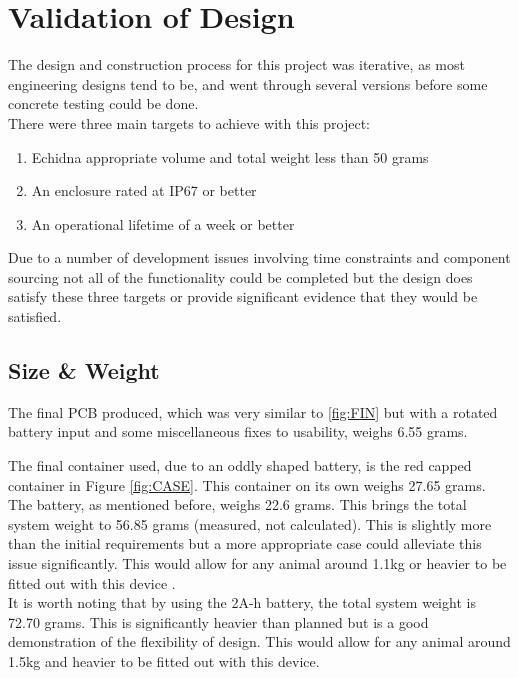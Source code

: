\documentclass[12pt,openany,a4paper]{book}
\begin{document}
	\section{Validation of Design}
		The design and construction process for this project was iterative, as most engineering designs tend to be, and went through several versions before some concrete testing could be done. \\
		
		There were three main targets to achieve with this project: \\
		\begin{enumerate}
			\item Echidna appropriate volume and total weight less than 50 grams
			\item An enclosure rated at IP67 or better
			\item An operational lifetime of a week or better
		\end{enumerate} 
		Due to a number of development issues involving time constraints and component sourcing not all of the functionality could be completed but the design does satisfy these three targets or provide significant evidence that they would be satisfied.\\
		
		\subsection{Size \& Weight}
		The final PCB produced, which was very similar to \ref{fig:FIN} but with a rotated battery input and some miscellaneous fixes to usability, weighs 6.55 grams.
		
		The final container used, due to an oddly shaped battery, is the red capped container in Figure \ref{fig:CASE}. This container on its own weighs 27.65 grams. \\
		
		The battery, as mentioned before, weighs 22.6 grams. This brings the total system weight to 56.85 grams (measured, not calculated). This is slightly more than the initial requirements but a more appropriate case could alleviate this issue significantly. This would allow for any animal around 1.1kg or heavier to be fitted out with this device \cite{Mamm87}. \\
		
		It is worth noting that by using the 2A-h battery, the total system weight is 72.70 grams. This is significantly heavier than planned but is a good demonstration of the flexibility of design. This would allow for any animal around 1.5kg and heavier to be fitted out with this device. \\
		
\end{document}
